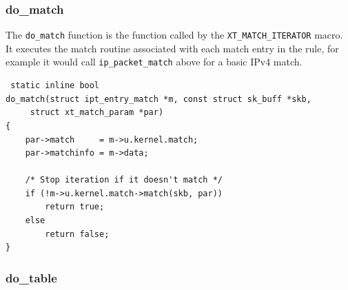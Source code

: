 \documentclass[a4paper,10pt]{article}
\newcommand{\code}[1]{\texttt{{#1}}}
\begin{document}
\subsubsection{do\_match}
The \code{do\_match} function is the function called by the
\code{XT\_MATCH\_ITERATOR} macro. It executes the match routine
associated with each match entry in the rule, for example it would call
\code{ip\_packet\_match} above for a basic IPv4 match.

\lstset{stepnumber=0}
\begin{lstlisting}
 static inline bool
do_match(struct ipt_entry_match *m, const struct sk_buff *skb,
	 struct xt_match_param *par)
{
	par->match     = m->u.kernel.match;
	par->matchinfo = m->data;

	/* Stop iteration if it doesn't match */
	if (!m->u.kernel.match->match(skb, par))
		return true;
	else
		return false;
}
\end{lstlisting}

\subsubsection{do\_table}
\end{document}
